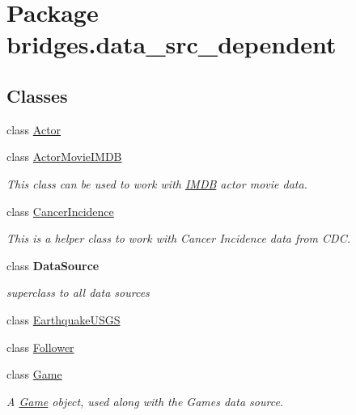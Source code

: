 \hypertarget{namespacebridges_1_1data__src__dependent}{}\section{Package bridges.\+data\+\_\+src\+\_\+dependent}
\label{namespacebridges_1_1data__src__dependent}
\subsection*{Classes}
\begin{DoxyCompactItemize}
\item 
class \mbox{\hyperlink{classbridges_1_1data__src__dependent_1_1_actor}{Actor}}
\item 
class \mbox{\hyperlink{classbridges_1_1data__src__dependent_1_1_actor_movie_i_m_d_b}{Actor\+Movie\+I\+M\+DB}}
\begin{DoxyCompactList}\small\item\em This class can be used to work with \mbox{\hyperlink{classbridges_1_1data__src__dependent_1_1_i_m_d_b}{I\+M\+DB}} actor movie data. \end{DoxyCompactList}\item 
class \mbox{\hyperlink{classbridges_1_1data__src__dependent_1_1_cancer_incidence}{Cancer\+Incidence}}
\begin{DoxyCompactList}\small\item\em This is a helper class to work with Cancer Incidence data from C\+DC. \end{DoxyCompactList}\item 
class {\bfseries Data\+Source}
\begin{DoxyCompactList}\small\item\em superclass to all data sources \end{DoxyCompactList}\item 
class \mbox{\hyperlink{classbridges_1_1data__src__dependent_1_1_earthquake_u_s_g_s}{Earthquake\+U\+S\+GS}}
\item 
class \mbox{\hyperlink{classbridges_1_1data__src__dependent_1_1_follower}{Follower}}
\item 
class \mbox{\hyperlink{classbridges_1_1data__src__dependent_1_1_game}{Game}}
\begin{DoxyCompactList}\small\item\em A \mbox{\hyperlink{classbridges_1_1data__src__dependent_1_1_game}{Game}} object, used along with the Games data source. \end{DoxyCompactList}\item 

\end{DoxyCompactItemize}
